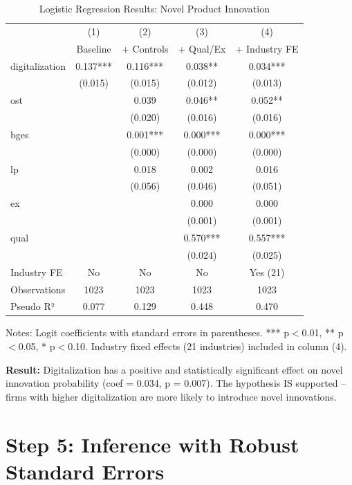\documentclass[a4paper,12pt]{article}
\begin{document}
\begin{table}[H]
\centering
\caption{Logistic Regression Results: Novel Product Innovation}
\label{tab:reg}
\begin{tabular}{lcccc}
\toprule
 & (1) & (2) & (3) & (4) \\
 & Baseline & + Controls & + Qual/Ex & + Industry FE \\
\midrule
digitalization & 0.137*** & 0.116*** & 0.038** & 0.034*** \\
 & (0.015) & (0.015) & (0.012) & (0.013) \\
ost & & 0.039 & 0.046** & 0.052** \\
 & & (0.020) & (0.016) & (0.016) \\
bges & & 0.001*** & 0.000*** & 0.000*** \\
 & & (0.000) & (0.000) & (0.000) \\
lp & & 0.018 & 0.002 & 0.016 \\
 & & (0.056) & (0.046) & (0.051) \\
ex & & & 0.000 & 0.000 \\
 & & & (0.001) & (0.001) \\
qual & & & 0.570*** & 0.557*** \\
 & & & (0.024) & (0.025) \\
Industry FE & No & No & No & Yes (21) \\
Observations & 1023 & 1023 & 1023 & 1023 \\
Pseudo R² & 0.077 & 0.129 & 0.448 & 0.470 \\
\bottomrule
\end{tabular}
\par
\small Notes: Logit coefficients with standard errors in parentheses. *** p$<$0.01, ** p$<$0.05, * p$<$0.10. Industry fixed effects (21 industries) included in column (4).
\end{table}

\textbf{Result:} Digitalization has a positive and statistically significant effect on novel innovation probability (coef = 0.034, p = 0.007). The hypothesis IS supported -- firms with higher digitalization are more likely to introduce novel innovations.

\section*{Step 5: Inference with Robust Standard Errors}
\end{document}
